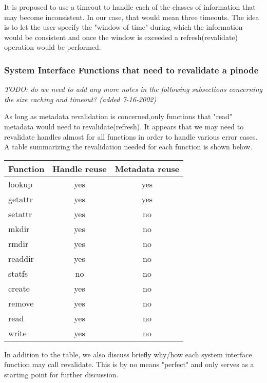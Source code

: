\documentclass[11pt, letterpaper]{article}
\begin{document}
It is proposed to use a timeout to handle each of the classes of
information that may become inconsistent. In our case, that would mean
three timeouts. The idea is to let the user specify the "window of time"
during which the information would be consistent and once the window
is exceeded a refresh(revalidate) operation would be performed.

\subsubsection{System Interface Functions that need to revalidate a pinode}

\emph{TODO: do we need to add any more notes in the following
subsections concerning the size caching and timeout? (added
7-16-2002)}

As long as metadata revalidation is concerned,only functions that "read"
metadata would need to revalidate(refresh). It appears that we may need 
to revalidate handles almost for all functions in order to handle various
error cases. A table summarizing the revalidation needed for each function
is shown below.\\ 

\begin{table}
\begin{tabular}{|l|c|c|}
\hline
Function & Handle reuse & Metadata reuse \\
\hline
\hline
lookup & yes & yes \\
getattr & yes & yes \\           
setattr & yes &  no \\ 
mkdir & yes & no \\         
rmdir & yes & no \\
readdir & yes & no \\
statfs & no & no \\
create & yes & no \\
remove & yes & no \\
read & yes & no \\
write & yes & no \\ 
\hline
\end{tabular}
\end{table}

In addition to the table, we also discuss briefly why/how each system interface
function may call revalidate. This is by no means "perfect" and only serves
as a starting point for further discussion.
\end{document}
